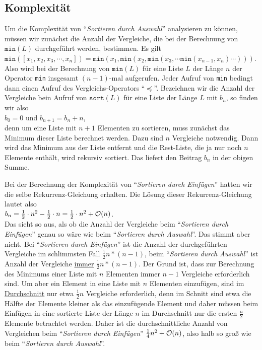 \subsection{Komplexit\"at}
Um die Komplexit\"at von ``\emph{Sortieren durch Auswahl}'' analysieren zu k\"onnen, m\"ussen
wir zun\"achst die Anzahl der Vergleiche, die bei der Berechnung von $\mathtt{min}(L)$
durchgef\"uhrt werden, bestimmen.  Es gilt \\[0.2cm]
\hspace*{1.3cm} 
$\mathtt{min}([x_1,x_2,x_3,\cdots,x_n]) = \mathtt{min}(x_1, \mathtt{min}(x_2, \mathtt{min}(x_3, \cdots \mathtt{min}(x_{n-1},x_n) \cdots )))$. 
\\[0.2cm]
Also wird bei der Berechnung von $\texttt{min}(L)$ f\"ur eine Liste $L$ der L\"ange $n$ der Operator
\texttt{min} insgesamt $(n-1)$-mal aufgerufen.  Jeder Aufruf von \texttt{min} bedingt dann
einen Aufruf des Vergleichs-Operators ``$\preceq$''.
Bezeichnen wir die Anzahl der Vergleiche bein Aufruf von $\texttt{sort}(L)$ f\"ur eine
Liste der L\"ange $L$ mit $b_n$, so finden wir also \\[0.2cm]
\hspace*{1.3cm} $b_0 = 0$ \quad und \quad $b_{n+1} = b_n + n$, \hspace*{\fill}\\[0.2cm]
denn um eine Liste mit $n+1$ Elementen zu sortieren, muss zun\"achst das Minimum dieser
Liste berechnet werden.  Dazu sind $n$ Vergleiche notwendig.  Dann wird das Minimum aus
der Liste entfernt und die Rest-Liste, die ja nur noch $n$ Elemente enth\"alt, wird rekursiv
sortiert.  Das liefert den Beitrag $b_n$ in der obigen Summe.

Bei der Berechnung der Komplexit\"at von ``\emph{Sortieren durch Einf\"ugen}'' hatten wir die
selbe Rekurrenz-Gleichung erhalten.  Die L\"osung dieser Rekurrenz-Gleichung lautet also \\[0.2cm]
\hspace*{1.3cm} $b_n = \frac{1}{2} \cdot n^2 - \frac{1}{2}\cdot n = \frac{1}{2} \cdot n^2 + \mathcal{O}(n)$. \\[0.2cm]
Das sieht so aus, als ob die Anzahl der Vergleiche beim ``\emph{Sortieren durch
  Einf\"ugen}'' genau so w\"are wie beim ``\emph{Sortieren durch Auswahl}''.  Das stimmt aber
nicht.  Bei ``\emph{Sortieren durch Einf\"ugen}'' ist die Anzahl der durchgef\"uhrten
Vergleiche im schlimmsten Fall $\frac{1}{2}n*(n-1)$, beim ``\emph{Sortieren durch
  Auswahl}'' ist Anzahl der Vergleiche \underline{immer} $\frac{1}{2}n*(n-1)$.  Der Grund
ist, dass zur Berechnung des Minimums einer Liste mit $n$ Elementen immer $n-1$ Vergleiche
erforderlich sind.  Um aber ein Element in eine Liste mit $n$ Elementen einzuf\"ugen, sind
im \underline{Durchschnitt} nur etwa $\frac{1}{2}n$ Vergleiche erforderlich, denn im Schnitt sind etwa
die H\"alfte der Elemente kleiner als das einzuf\"ugende Element und daher m\"ussen beim Einf\"ugen
in eine sortierte Liste der L\"ange $n$ im Durchschnitt nur die ersten $\frac{n}{2}$
Elemente betrachtet werden.  Daher ist die durchschnittliche Anzahl von Vergleichen beim
``\emph{Sortieren durch Einf\"ugen}'' $\frac{1}{4}n^2 + \mathcal{O}(n)$, also halb so gro{\ss} wie beim
``\emph{Sortieren durch Auswahl}''.


